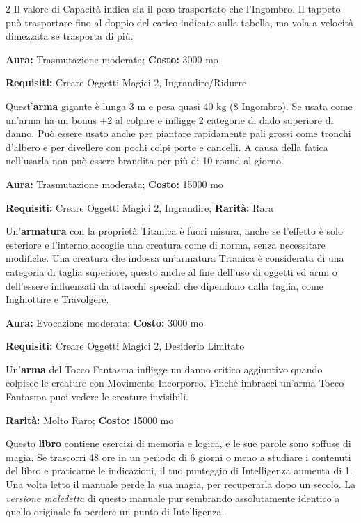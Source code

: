 \begin{multicols}{2}
\medskip
Il valore di Capacità indica sia il peso trasportato che l'Ingombro. Il tappeto può trasportare fino al doppio del carico indicato sulla tabella, ma vola a velocità dimezzata se trasporta di più.


\textbf{Aura:} Trasmutazione moderata; \textbf{Costo:} 3000 mo

\textbf{Requisiti:} Creare Oggetti Magici 2, Ingrandire/Ridurre

Quest'\textbf{arma} gigante è lunga 3 m e pesa quasi 40 kg (8 Ingombro). Se usata come un'arma ha un bonus +2 al colpire e infligge 2 categorie di dado superiore di danno. Può essere usato anche per piantare rapidamente pali grossi come tronchi d'albero e per divellere con pochi colpi porte e cancelli. A causa della fatica nell'usarla non può essere brandita per più di 10 round al giorno.


\textbf{Aura:} Trasmutazione moderata; \textbf{Costo:} 15000 mo

\textbf{Requisiti:} Creare Oggetti Magici 2, Ingrandire; \textbf{Rarità:} Rara

Un'\textbf{armatura} con la proprietà Titanica è fuori misura, anche se l'effetto è solo esteriore e l'interno accoglie una creatura come di norma, senza necessitare modifiche. Una creatura che indossa un'armatura Titanica è considerata di una categoria di taglia superiore, questo anche al fine dell'uso di oggetti ed armi o dell'essere influenzati da attacchi speciali che dipendono dalla taglia, come Inghiottire e Travolgere.


\textbf{Aura:} Evocazione moderata; \textbf{Costo:} 3000 mo

\textbf{Requisiti:} Creare Oggetti Magici 2, Desiderio Limitato

Un'\textbf{arma} del Tocco Fantasma infligge un danno critico aggiuntivo quando colpisce le creature con Movimento Incorporeo. Finché imbracci un'arma Tocco Fantasma puoi vedere le creature invisibili.


\textbf{Rarità:} Molto Raro; \textbf{Costo:} 15000 mo

Questo \textbf{libro} contiene esercizi di memoria e logica, e le sue parole sono soffuse di magia. Se trascorri 48 ore in un periodo di 6 giorni o meno a studiare i contenuti del libro e praticarne le indicazioni, il tuo punteggio di Intelligenza aumenta di 1. Una volta letto il manuale perde la sua magia, per recuperarla dopo un secolo. La \emph{versione maledetta} di questo manuale pur sembrando assolutamente identico a quello originale fa perdere un punto di Intelligenza.


\end{multicols}

